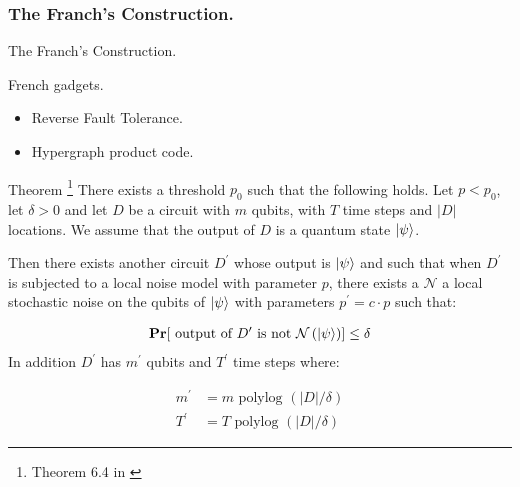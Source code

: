 \documentclass{beamer}
\begin{document}
\begin{frame}
  \frametitle{The Franch's Construction.
}

  \begin{refsection}
\cite{Tillich_2014} \cite{Leverrier_2015} \cite{grospellier:tel-03364419}
  \printbibliography
\end{refsection}

\end{frame}


\begin{frame}{The Franch's Construction.}
 \begin{block}{French gadgets.}
   \begin{itemize}
     \item Reverse Fault Tolerance.
     \item Hypergraph product code. 
   \end{itemize}
 \end{block}
\end{frame}

\begin{frame}
  \begin{block}{Theorem \footnote{Theorem 6.4 in \cite{grospellier:tel-03364419}}} There exists a threshold $p_{0}$ such that the following holds. Let $p < p_{0}$, let $\delta > 0$ and let $D$ be a circuit with $m$ qubits, with $T$ time steps and $|D|$ locations. We assume that the output of $D$ is a quantum state $\ket{\psi}$. 

    Then there exists another circuit $D^{\prime}$ whose output is $\ket{\psi}$ and such that when $D^{\prime}$ is subjected to a local noise model with parameter $p$, there exists a $\mathcal{N}$ a local stochastic noise on the qubits of $\ket{\psi}$ with parameters $p^{\prime} = c \cdot p$ such that: 

    \begin{equation*}
      \begin{split}
        \mathbf{Pr}[  \text{ output of } D^{\prime} \text { is not } \mathcal{N}\left( \ket{\psi} \right)   ]\le \delta
      \end{split}
    \end{equation*}
    In addition $D^{\prime}$ has $m^{\prime}$ qubits and $T^{\prime}$ time steps where: 

    \begin{equation*}
      \begin{split}
        m^{\prime} &= m \text{ polylog } \left( |D|/\delta \right) \\ 
        T^{\prime} &= T \text{ polylog } \left( |D|/\delta \right) 
      \end{split}
    \end{equation*}
  \end{block}
\end{frame}
\end{document}
